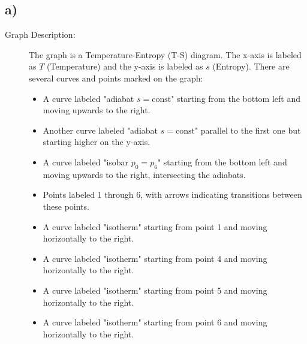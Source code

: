 

\subsection*{a)}

\begin{description}
    \item[Graph Description:] The graph is a Temperature-Entropy (T-S) diagram. The x-axis is labeled as $T$ (Temperature) and the y-axis is labeled as $s$ (Entropy). There are several curves and points marked on the graph:
    \begin{itemize}
        \item A curve labeled "adiabat $s = \text{const}$" starting from the bottom left and moving upwards to the right.
        \item Another curve labeled "adiabat $s = \text{const}$" parallel to the first one but starting higher on the y-axis.
        \item A curve labeled "isobar $p_0 = p_6$" starting from the bottom left and moving upwards to the right, intersecting the adiabats.
        \item Points labeled 1 through 6, with arrows indicating transitions between these points.
        \item A curve labeled "isotherm" starting from point 1 and moving horizontally to the right.
        \item A curve labeled "isotherm" starting from point 4 and moving horizontally to the right.
        \item A curve labeled "isotherm" starting from point 5 and moving horizontally to the right.
        \item A curve labeled "isotherm" starting from point 6 and moving horizontally to the right.
    \end{itemize}
\end{description}